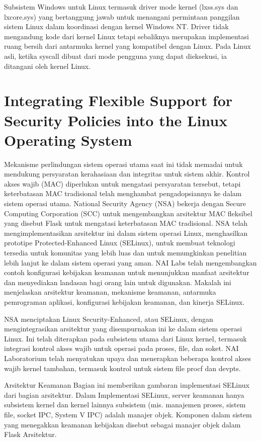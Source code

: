 \begin{enumeratae}
Subsistem Windows untuk Linux termasuk driver mode kernel (lxss.sys dan lxcore.sys) yang bertanggung jawab untuk menangani permintaan panggilan sistem Linux dalam koordinasi dengan kernel Windows NT. Driver tidak mengandung kode dari kernel Linux tetapi sebaliknya merupakan implementasi ruang bersih dari antarmuka kernel yang kompatibel dengan Linux. Pada Linux asli, ketika syscall dibuat dari mode pengguna yang dapat dieksekusi, ia ditangani oleh kernel Linux.

\section{Integrating Flexible Support for Security Policies into the Linux Operating System}
Mekanisme perlindungan sistem operasi utama saat ini tidak memadai untuk mendukung persyaratan kerahasiaan dan integritas untuk sistem akhir. Kontrol akses wajib (MAC) diperlukan untuk mengatasi persyaratan tersebut, tetapi keterbatasan MAC tradisional telah menghambat pengadopsiannya ke dalam sistem operasi utama. National Security Agency (NSA) bekerja dengan Secure Computing Corporation (SCC) untuk mengembangkan arsitektur MAC fleksibel yang disebut Flask untuk mengatasi keterbatasan MAC tradisional. NSA telah mengimplementasikan arsitektur ini dalam sistem operasi Linux, menghasilkan prototipe Protected-Enhanced Linux (SELinux), untuk membuat teknologi tersedia untuk komunitas yang lebih luas dan untuk memungkinkan penelitian lebih lanjut ke dalam sistem operasi yang aman. NAI Labs telah mengembangkan contoh konfigurasi kebijakan keamanan untuk menunjukkan manfaat arsitektur dan menyediakan landasan bagi orang lain untuk digunakan. Makalah ini menjelaskan arsitektur keamanan, mekanisme keamanan, antarmuka pemrograman aplikasi, konfigurasi kebijakan keamanan, dan kinerja SELinux.

NSA menciptakan Linux Security-Enhanced, atau SELinux, dengan mengintegrasikan arsitektur yang disempurnakan ini ke dalam sistem operasi Linux. Ini telah diterapkan pada subsistem utama dari Linux kernel, termasuk integrasi kontrol akses wajib untuk operasi pada proses, file, dan soket. NAI Laboratorium telah menyatukan upaya dan menerapkan beberapa kontrol akses wajib kernel tambahan, termasuk kontrol untuk sistem file procf dan devpts.

Arsitektur Keamanan
Bagian ini memberikan gambaran implementasi SELinux dari bagian arsitektur. Dalam Implementasi SELinux, server keamanan hanya subsistem kernel dan kernel lainnya subsistem (mis. manajemen proses, sistem file, socket IPC, System V IPC) adalah manajer objek. Komponen dalam sistem yang menegakkan keamanan kebijakan disebut sebagai manajer objek dalam Flask Arsitektur.



\end{enumeratae}
